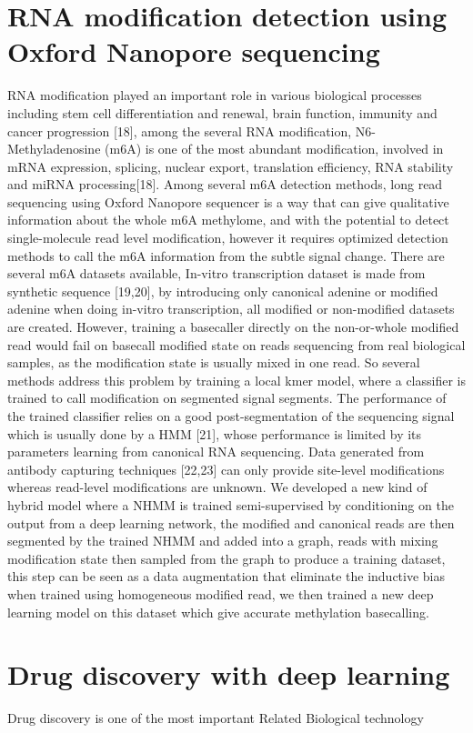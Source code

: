 \section{RNA modification detection using Oxford Nanopore sequencing}
RNA modification played an important role in various biological processes including stem cell differentiation and renewal, brain function, immunity and cancer progression [18], among the several RNA modification, N6-Methyladenosine (m6A) is one of the most abundant modification, involved in mRNA expression, splicing, nuclear export, translation efficiency, RNA stability and miRNA processing[18]. Among several m6A detection methods, long read sequencing using Oxford Nanopore sequencer is a way that can give qualitative information about the whole m6A methylome, and with the potential to detect single-molecule read level modification, however it requires optimized detection methods to call the m6A information from the subtle signal change. There are several m6A datasets available, In-vitro transcription dataset is made from synthetic sequence [19,20], by introducing only canonical adenine or modified adenine when doing in-vitro transcription, all modified or non-modified datasets are created. However, training a basecaller directly on the non-or-whole modified read would fail on basecall modified state on reads sequencing from real biological samples, as the modification state is usually mixed in one read. So several methods address this problem by training a local kmer model, where a classifier is trained to call modification on segmented signal segments. The performance of the trained classifier relies on a good post-segmentation of the sequencing signal which is usually done by a HMM [21], whose performance is limited by its parameters learning from canonical RNA sequencing. Data generated from antibody capturing techniques [22,23] can only provide site-level modifications whereas read-level modifications are unknown. We developed a new kind of hybrid model where a NHMM is trained semi-supervised by conditioning on the output from a deep learning network, the modified and canonical reads are then segmented by the trained NHMM and added into a graph, reads with mixing modification state then sampled from the graph to produce a training dataset, this step can be seen as a data augmentation that eliminate the inductive bias when trained using homogeneous modified read, we then trained a new deep learning model on this dataset which give accurate methylation basecalling.
\section{Drug discovery with deep learning}
Drug discovery is one of the most important 
Related Biological technology

